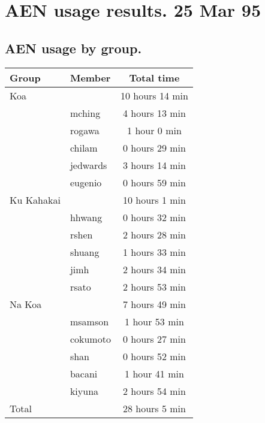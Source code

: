 







\chapter{AEN usage results. 25 Mar 95}

\section{AEN usage by group.}
\begin{tabular}{|l|l|c|}
\hline
Group&Member&Total time\\
\hline
\hline
Koa&&10 hours 14 min\\
\hline
&mching&4 hours 13 min\\
&rogawa&1 hour 0 min\\
&chilam&0 hours 29 min\\
&jedwards&3 hours 14 min\\
&eugenio&0 hours 59 min\\
\hline
\hline
Ku Kahakai&&10 hours 1 min\\
\hline
&hhwang&0 hours 32 min\\
&rshen&2 hours 28 min\\
&shuang&1 hours 33 min\\
&jimh&2 hours 34 min\\
&rsato&2 hours 53 min\\
\hline
\hline
Na Koa&&7 hours 49 min\\
\hline
&msamson&1 hour 53 min\\
&cokumoto&0 hours 27 min\\
&shan&0 hours 52 min\\
&bacani&1 hour 41 min\\
&kiyuna&2 hours 54 min\\
\hline
\hline
Total&&28 hours 5 min\\
\hline
\end{tabular} \\


